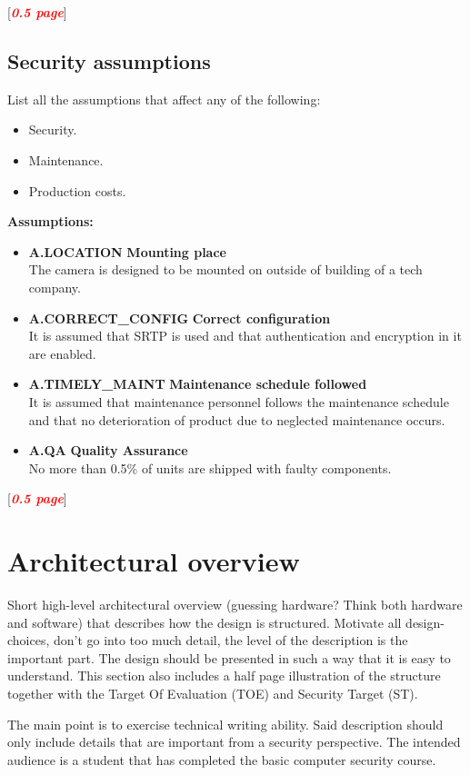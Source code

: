 \documentclass[10pt]{article}
\newcommand{\comm}[1]{{\leavevmode\color{gray}#1}}
\newcommand{\todo}[1]{
  \begin{center}
    [\textcolor{red}{\textbf{\textit{#1}}}]
  \end{center}
}
\newcommand{\assumption}[3]{\item{\textbf{A.#1} \hfill \textbf{#2} \\ #3}} %
\begin{document}
    \todo{0.5 page}

    \subsection{Security assumptions}

      \comm{
        List all the assumptions that affect any of the following:
        \begin{itemize}
          \item{Security.}
          \item{Maintenance.}
          \item{Production costs.}
        \end{itemize}
      }
	\textbf{Assumptions:}
     \begin{itemize}
	\assumption{LOCATION}{Mounting place}{The camera is designed to be mounted on outside of building of a tech company.}
	\assumption{CORRECT\_CONFIG}{Correct configuration}{It is assumed that SRTP is used and that authentication and encryption in it are enabled.}
	\assumption{TIMELY\_MAINT}{Maintenance schedule followed}{It is assumed that maintenance personnel follows the maintenance schedule
	and that no deterioration of product due to neglected maintenance occurs.}
	\assumption{QA}{Quality Assurance}{No more than 0.5\% of units are shipped with faulty components.}
     \end{itemize}

      \todo{0.5 page}

  \section{Architectural overview}

    \comm{
      Short high-level architectural overview (guessing hardware? Think both hardware and software) that
      describes how the design is structured. Motivate all design-choices,
      don't go into too much detail, the level of the description is the
      important part. The design should be presented in such a way that it is
      easy to understand. This section also includes a half page illustration
      of the structure together with the Target Of Evaluation (TOE) and
      Security Target (ST).

      The main point is to exercise technical writing ability. Said description
      should only include details that are important from a security
      perspective. The intended audience is a student that has completed the
      basic computer security course.
    }
\end{document}

